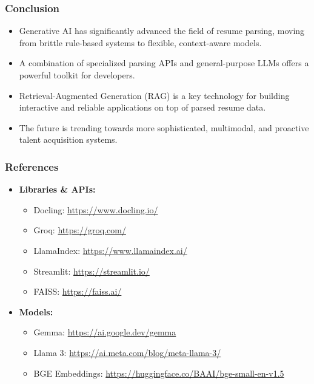 \begin{frame}[fragile]\frametitle{Conclusion}
    \begin{itemize}
        \item Generative AI has significantly advanced the field of resume parsing, moving from brittle rule-based systems to flexible, context-aware models.
        \item A combination of specialized parsing APIs and general-purpose LLMs offers a powerful toolkit for developers.
        \item Retrieval-Augmented Generation (RAG) is a key technology for building interactive and reliable applications on top of parsed resume data.
        \item The future is trending towards more sophisticated, multimodal, and proactive talent acquisition systems.
    \end{itemize}
\end{frame}

\begin{frame}[fragile]\frametitle{References}
    \begin{itemize}
        \item \textbf{Libraries \& APIs:}
        \begin{itemize}
            \item Docling: \url{https://www.docling.io/}
            \item Groq: \url{https://groq.com/}
            \item LlamaIndex: \url{https://www.llamaindex.ai/}
            \item Streamlit: \url{https://streamlit.io/}
            \item FAISS: \url{https://faiss.ai/}
        \end{itemize}
        \item \textbf{Models:}
        \begin{itemize}
            \item Gemma: \url{https://ai.google.dev/gemma}
            \item Llama 3: \url{https://ai.meta.com/blog/meta-llama-3/}
            \item BGE Embeddings: \url{https://huggingface.co/BAAI/bge-small-en-v1.5}
        \end{itemize}
    \end{itemize}
\end{frame}
